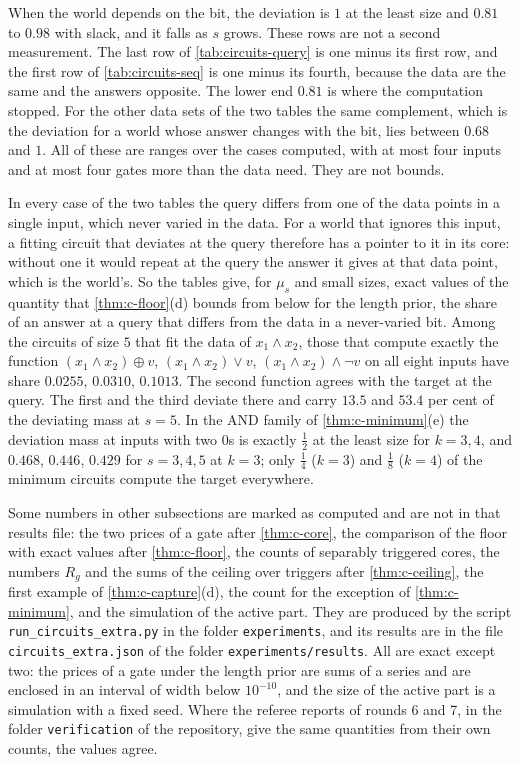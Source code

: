 When the world depends on the bit, the deviation is $1$ at the least size and $0.81$ to $0.98$ with slack, and
it falls as $s$ grows. These rows are not a second measurement. The last row of \cref{tab:circuits-query} is
one minus its first row, and the first row of \cref{tab:circuits-seq} is one minus its fourth, because the
data are the same and the answers opposite. The lower end $0.81$ is where the computation stopped. For the
other data sets of the two tables the same complement, which is the deviation for a world whose answer changes
with the bit, lies between $0.68$ and $1$. All of these are ranges over the cases computed, with at most four
inputs and at most four gates more than the data need. They are not bounds.

In every case of the two tables the query differs from one of the data points in a single input, which never
varied in the data. For a world that ignores this input, a fitting circuit that deviates at the query
therefore
has a pointer to it in its core: without one it would repeat at the query the answer it gives at that data
point, which is the world's. So the tables give, for $\mu_s$ and small sizes, exact values of the quantity
that \cref{thm:c-floor}(d) bounds from below for the length prior, the share of an answer at a query that
differs from the data in a never-varied bit. Among the circuits of size $5$ that fit the data of
$x_1\wedge x_2$, those that compute exactly the function $(x_1\wedge x_2)\oplus v$, $(x_1\wedge x_2)\vee v$,
$(x_1\wedge x_2)\wedge\neg v$ on all eight inputs have share $0.0255$, $0.0310$, $0.1013$. The second function
agrees with the target at the query. The first and the third deviate there and carry $13.5$ and $53.4$ per
cent of the deviating mass at $s=5$. In the AND family of \cref{thm:c-minimum}(e) the deviation mass at inputs
with two $0$s is exactly $\frac12$ at the least size for $k=3,4$, and $0.468$, $0.446$, $0.429$ for $s=3,4,5$
at $k=3$; only $\frac14$ ($k=3$) and $\frac18$ ($k=4$) of the minimum circuits compute the target everywhere.

Some numbers in other subsections are marked as computed and are not in that results file: the two prices
of a gate after \cref{thm:c-core}, the comparison of the floor with exact values after \cref{thm:c-floor},
the counts of separably triggered cores, the numbers $R_g$ and the sums of the ceiling over triggers after
\cref{thm:c-ceiling}, the first example of \cref{thm:c-capture}(d), the count for the exception of
\cref{thm:c-minimum}, and the simulation of the active part. They are produced by the script
\texttt{run\_circuits\_extra.py} in the folder \texttt{experiments}, and its results are in the file
\texttt{circuits\_extra.json} of the folder \texttt{experiments/results}.
All are exact except two: the prices of a gate under the length prior are sums of a series and are enclosed
in an interval of width below $10^{-10}$, and the size of the active part is a simulation with a fixed seed.
Where the referee reports of rounds 6 and 7, in the folder \texttt{verification} of the repository, give the
same quantities from their own counts, the values agree.

